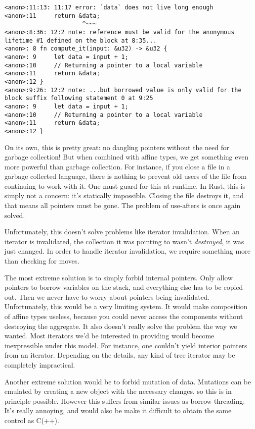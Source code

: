 \begin{verbatim}
<anon>:11:13: 11:17 error: `data` does not live long enough
<anon>:11     return &data;
                      ^~~~
<anon>:8:36: 12:2 note: reference must be valid for the anonymous lifetime #1 defined on the block at 8:35...
<anon>: 8 fn compute_it(input: &u32) -> &u32 {
<anon>: 9     let data = input + 1;
<anon>:10     // Returning a pointer to a local variable
<anon>:11     return &data;
<anon>:12 }
<anon>:9:26: 12:2 note: ...but borrowed value is only valid for the block suffix following statement 0 at 9:25
<anon>: 9     let data = input + 1;
<anon>:10     // Returning a pointer to a local variable
<anon>:11     return &data;
<anon>:12 }
\end{verbatim}

On its own, this is pretty great: no dangling pointers without the need for
garbage collection! But when combined with affine types,
we get something even more powerful than garbage collection. For instance, if
you close a file in a garbage collected language, there is nothing to prevent
old users of the file from continuing to work with it. One must guard for
this at runtime. In Rust, this is simply not a concern:
it's statically impossible. Closing the file destroys it, and that means all
pointers must be gone. The problem of use-afters is once again solved.

Unfortunately, this doesn't solve problems like iterator invalidation. When an
iterator is invalidated, the collection it was pointing to wasn't \emph{destroyed},
it was just changed. In order to handle iterator invalidation, we require something
more than checking for moves.

The most extreme solution is to simply forbid internal pointers. Only allow
pointers to borrow variables on the stack, and everything else has to be copied
out. Then we never have to worry about pointers being invalidated. Unfortunately,
this would be a very limiting system. It would make composition of affine types useless,
because you could never access the components without destroying the aggregate.
It also doesn't really solve the problem the way we wanted. Most iterators we'd
be interested in providing would become inexpressible under this model. For
instance, one couldn't yield interior pointers from an iterator. Depending on
the details, any kind of tree iterator may be completely impractical.

Another extreme solution would be to forbid mutation of data. Mutations can be emulated
by creating a new object with the necessary changes, so this is in principle
possible. However this suffers from similar issues as borrow threading: It's
really annoying, and would also be make it difficult to obtain the same
control as C(++).

